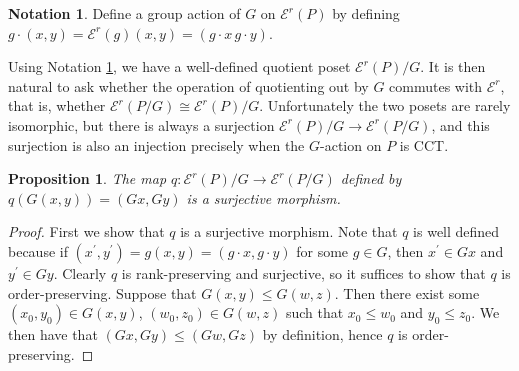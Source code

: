 \documentclass[10 pt]{amsart}
\theoremstyle{plain}
\newtheorem{prop}[thm]{Proposition}
\theoremstyle{definition}
\newtheorem{note}[thm]{Notation}
\theoremstyle{remark}
\numberwithin{equation}{section}
\newcommand\rk{\operatorname{rk}}
\begin{document}
\begin{note}\label{note:G_action_on_FP}
Define a group action of $G$ on $\mathcal E^r(P)$ by defining $g\cdot (x, y) = \mathcal E^r(g)(x,y) = (g\cdot x\, g\cdot y)$.
\end{note}

Using Notation \ref{note:G_action_on_FP}, we have a well-defined quotient poset $\mathcal E^r(P)/G$.  It is then natural to ask whether the operation of quotienting out by $G$ commutes with $\mathcal E^r$, that is, whether $\mathcal E^r(P/G) \cong \mathcal E^r(P)/G$.  Unfortunately the two posets are rarely isomorphic, but there is always a surjection $\mathcal E^r(P)/G\rightarrow \mathcal E^r(P/G)$, and this surjection is also an injection precisely when the $G$-action on $P$ is CCT.


\begin{prop}\label{prop:surjection_between_F_quotients}
The map $q\colon \mathcal E^r(P)/G\rightarrow \mathcal E^r(P/G)$ defined by $q(G(x, y)) = (Gx,Gy)$ is a surjective morphism.
\end{prop}

\begin{proof}



First we show that $q$ is a surjective morphism.  Note that $q$ is well defined because if $(x^\prime, y^\prime) = g(x, y) = (g\cdot x, g\cdot y)$ for some $g\in G$, then $x^\prime\in Gx$ and $y^\prime\in Gy$.  Clearly $q$ is rank-preserving and surjective, so it suffices to show that $q$ is order-preserving.  Suppose that $G(x, y) \le G(w, z)$.  Then there exist some $(x_0, y_0)\in G(x, y)$, $(w_0, z_0)\in G(w, z)$ such that $x_0\le w_0$ and $y_0\le z_0$.  We then have that $(Gx, Gy) \le (Gw, Gz)$ by definition, hence $q$ is order-preserving.
\end{proof}
\end{document}
